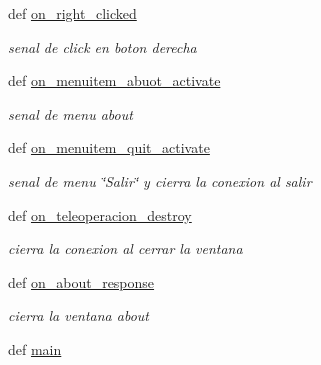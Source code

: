 \begin{DoxyCompactItemize}
def \hyperlink{classinicio_1_1prueba__teleoperacion_a82dcd1b98128e1bd57888c33da04822f}{on\_\-right\_\-clicked}
\begin{DoxyCompactList}\small\item\em senal de click en boton derecha \end{DoxyCompactList}\item 
def \hyperlink{classinicio_1_1prueba__teleoperacion_a55a13ddd9ee8e7cd988da1e16529075f}{on\_\-menuitem\_\-abuot\_\-activate}
\begin{DoxyCompactList}\small\item\em senal de menu about \end{DoxyCompactList}\item 
def \hyperlink{classinicio_1_1prueba__teleoperacion_a7c67742cb015d12bfed3a100c86531f4}{on\_\-menuitem\_\-quit\_\-activate}
\begin{DoxyCompactList}\small\item\em senal de menu \char`\"{}Salir\char`\"{} y cierra la conexion al salir \end{DoxyCompactList}\item 
def \hyperlink{classinicio_1_1prueba__teleoperacion_a5a62493b6baef7d7522eea0f54a8d448}{on\_\-teleoperacion\_\-destroy}
\begin{DoxyCompactList}\small\item\em cierra la conexion al cerrar la ventana \end{DoxyCompactList}\item 
def \hyperlink{classinicio_1_1prueba__teleoperacion_ad4c3a1c8710e3f6d3ea9a20fec779df7}{on\_\-about\_\-response}
\begin{DoxyCompactList}\small\item\em cierra la ventana about \end{DoxyCompactList}\item 
def \hyperlink{classinicio_1_1prueba__teleoperacion_a345d811d73e36e3176551377efbed762}{main}
\end{DoxyCompactItemize}
